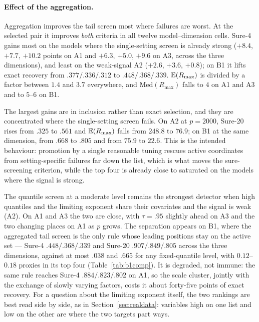 \paragraph{Effect of the aggregation.}
Aggregation improves the tail screen most where failures are worst. At the
selected pair it improves \emph{both} criteria in all twelve
model--dimension cells. Sure-4 gains most on the models where the
single-setting screen is already strong ($+8.4$, $+7.7$, $+10.2$ points
on A1 and $+6.3$, $+5.0$, $+9.6$ on A3, across the three dimensions),
and least on the weak-signal A2 ($+2.6$, $+3.6$, $+0.8$); on B1 it
lifts exact recovery from $.377/.336/.312$ to $.448/.368/.339$.
$\mathbb E(R_{\max})$ is divided by a factor between $1.4$ and $3.7$
everywhere, and $\mathrm{Med}(R_{\max})$ falls to $4$ on A1 and A3 and
to $5$--$6$ on B1.

The largest gains are in inclusion rather than exact selection, and
they are concentrated where the single-setting screen fails. On A2 at
$p=2000$, Sure-20 rises from $.325$ to $.561$ and $\mathbb E(R_{\max})$ falls
from $248.8$ to $76.9$; on B1 at the same dimension, from $.668$ to
$.805$ and from $75.9$ to $22.6$. This is the intended behaviour:
promotion by a single reasonable tuning rescues active coordinates from
setting-specific failures far down the list, which is what moves the
sure-screening criterion, while the top four is already close to
saturated on the models where the signal is strong.

The quantile screen at a moderate level remains the strongest detector
when high quantiles and the limiting exponent share their covariates
and the signal is weak (A2). On A1 and A3 the two are close, with
$\tau=.95$ slightly ahead on A3 and the two changing places on A1 as
$p$ grows. The separation appears on B1, where the aggregated tail
screen is the only rule whose leading positions stay on the active set
--- Sure-4 $.448/.368/.339$ and Sure-20 $.907/.849/.805$ across the
three dimensions, against at most $.038$ and $.665$ for any
fixed-quantile level, with $0.12$--$0.18$ proxies in its top four
(Table~\ref{tab:b1comp}). It is degraded, not
immune: the same rule reaches Sure-4 $.884/.823/.802$ on A1, so the
scale cluster, jointly with the exchange of slowly varying factors,
costs it about forty-five points of exact recovery. For a question
about the limiting exponent itself, the two rankings are best read
side by side, as in Section~\ref{sec:realdata}: variables high on one
list and low on the other are where the two targets part ways.
